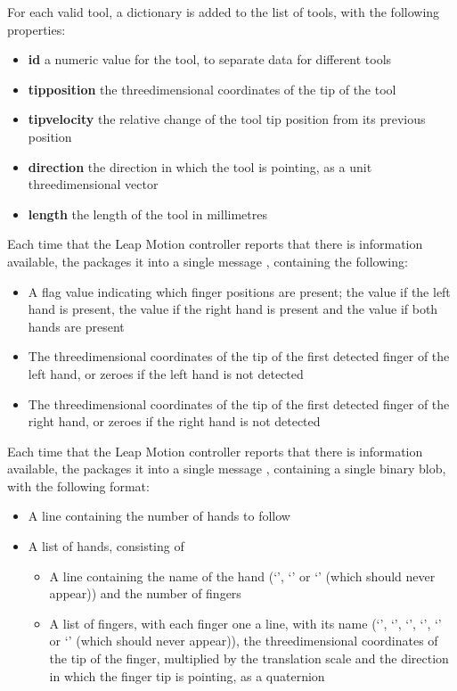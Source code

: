 For each valid tool, a dictionary is added to the list of tools, with the following
properties:
\begin{itemize}
\item\textbf{id} \longDash{} a numeric value for the tool, to separate data for different
tools
\item\exSp\textbf{tipposition} \longDash{} the three\longDash{}dimensional coordinates of
the tip of the tool
\item\exSp\textbf{tipvelocity} \longDash{} the relative change of the tool tip position
from its previous position
\item\exSp\textbf{direction} \longDash{} the direction in which the tool is pointing, as a
unit three\longDash{}dimensional vector
\item\exSp\textbf{length} \longDash{} the length of the tool in millimetres
\end{itemize}
\primaryEnd
{}
Each time that the Leap Motion controller reports that there is information available,
the  packages it into a single message
\openSq{}\closeSq, containing the following:
\begin{itemize}
\item A flag value indicating which finger positions are present; the value  if
the left hand is present, the value  if the right hand is present and the value
 if both hands are present
\item\exSp{}The three\longDash{}dimensional coordinates of the tip of the first detected
finger of the left hand, or zeroes if the left hand is not detected
\item\exSp{}The three\longDash{}dimensional coordinates of the tip of the first detected
finger of the right hand, or zeroes if the right hand is not detected
\end{itemize}
\primaryEnd{}
Each time that the Leap Motion controller reports that there is information available,
the  packages it into a single message
\openSq{}\closeSq, containing a single binary blob, with the following
format:
\begin{itemize}
\item A line containing the number of hands to follow
\item\exSp{}A list of hands, consisting of
\begin{itemize}
\item A line containing the name of the hand (`', `' or
`' (which should never appear)) and the number of fingers
\item\exSp{}A list of fingers, with each finger one a line, with its name
(`', `', `', `', `'
or `' (which should never appear)), the three\longDash{}dimensional
coordinates of the tip of the finger, multiplied by the translation scale and the
direction in which the finger tip is pointing, as a quaternion
\end{itemize}
\end{itemize}
\primaryEnd{}
